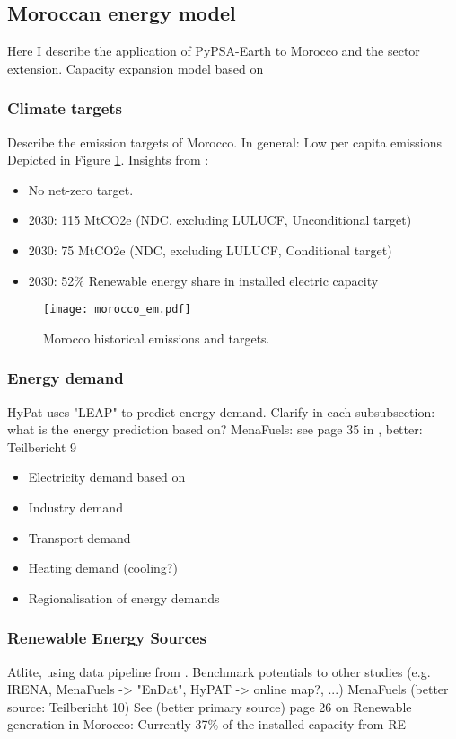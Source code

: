 
\subsection{Moroccan energy model}
\label{subsec:moroccan_model}
Here I describe the application of PyPSA-Earth \cite{Parzen2022} to Morocco and the sector extension.
Capacity expansion model based on \cite{Brown2018}


\subsubsection{Climate targets}
Describe the emission targets of Morocco. In general: Low per capita emissions
Depicted in Figure \ref{fig:morocco_em}.
Insights from \cite{CAT2021}:
\begin{itemize}
    \item No net-zero target.
    \item 2030: 115 MtCO2e (NDC, excluding LULUCF, Unconditional target)
    \item 2030: 75 MtCO2e (NDC, excluding LULUCF, Conditional target)
    \item 2030: 52\% Renewable energy share in installed electric capacity
\end{itemize}

\begin{figure}[h!]
    \centering
    \texttt{[image: morocco\_em.pdf]}
    \caption{Morocco historical emissions and targets.}
    \label{fig:morocco_em}
\end{figure}


\subsubsection{Energy demand}
HyPat uses "LEAP" to predict energy demand.
Clarify in each subsubsection: what is the energy prediction based on?
MenaFuels: see page 35 in \cite{Ersoy2022}, better: Teilbericht 9
\begin{itemize}
    \item Electricity demand based on \cite{Parzen2022}
    \item Industry demand
    \item Transport demand
    \item Heating demand (cooling?) 
    \item Regionalisation of energy demands
\end{itemize}


\subsubsection{Renewable Energy Sources}
Atlite, using data pipeline from \cite{Parzen2022}.
Benchmark potentials to other studies (e.g. IRENA, MenaFuels -> "EnDat", HyPAT -> online map?, ...)
MenaFuels \cite{Ersoy2022} (better source: Teilbericht 10)
See \cite{Ersoy2022} (better primary source) page 26 on Renewable generation in Morocco: Currently 37\% of the installed capacity from RE

